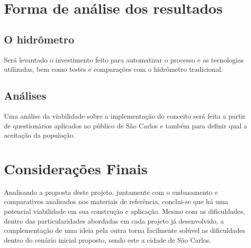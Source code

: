 \documentclass[
	article,			%
	11pt,				%
	oneside,			%
	a4paper,			%
	english,			%
	brazil,				%
	sumario=tradicional,
	doublespacing
	]{abntex2}
\begin{document}
\begin{DoubleSpace}
\section{Forma de análise dos resultados}
\subsection{O hidrômetro}
Será levantado o investimento feito para automatizar o processo e as tecnologias utilizadas, bem como testes e comparações com o hidrômetro tradicional.

\subsection{Análises}
Uma análise da viabilidade sobre a implementação do conceito será feita a partir de questionários aplicados ao público de São Carlos e também para definir qual a aceitação da população.

\section{Considerações Finais}
Analisando a proposta deste projeto, juntamente com o embasamento e comparativos analisados nos materiais de referência, conclui-se que há uma potencial viabilidade em sua construção e aplicação. Mesmo com as dificuldades, dentro das particularidades abordadas em cada projeto já desenvolvido, a complementação de uma ideia pela outra torna facilmente solúvel as dificuldades dentro do cenário inicial proposto, sendo este a cidade de São Carlos.

\end{DoubleSpace}
\newpage

\end{document}
